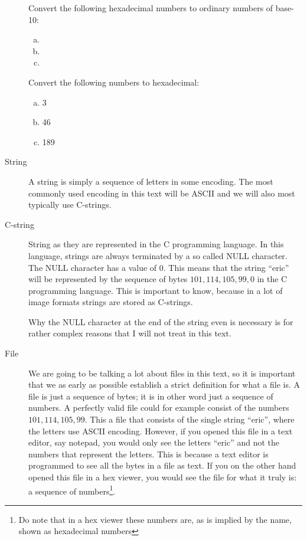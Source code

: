 \begin{description}
  \begin{Exercise}[label={hex-to-n}]
    Convert the following hexadecimal numbers to ordinary numbers of
    base-10:

    \begin{enumerate}[(a)]
    \item {}
    \item {}
    \item {}
    \end{enumerate}

  \end{Exercise}

  \begin{Exercise}[label={n-to-hex}]
    Convert the following numbers to hexadecimal:

    \begin{enumerate}[(a)]
    \item 3
    \item 46
    \item 189
    \end{enumerate}

  \end{Exercise}

\item[String] A string is simply a sequence of letters in some
  encoding. The most commonly used encoding in this text will be
  ASCII \cite{rfc20} and we will also most typically use C-strings.

\item[C-string] String as they are represented in the C programming
  language. In this language, strings are always terminated by a so
  called NULL character. The NULL character has a value of
  $0$\cite{kernighan1988c}. This means that the string ``eric'' will
  be represented by the sequence of bytes $101,114,105,99, 0$ in the C
  programming language. This is important to know, because in a lot of
  image formats strings are stored as C-strings.

  Why the NULL character at the end of the string even is necessary is
  for rather complex reasons that I will not treat in this text.

\item[File] We are going to be talking a lot about files in this text,
  so it is important that we as early as possible establish a strict
  definition for what a file is. A file is just a sequence of bytes;
  it is in other word just a sequence of numbers. A perfectly valid
  file could for example consist of the numbers $101,114,105,99$. This
  a file that consists of the single string ``eric'', where the
  letters use ASCII encoding. However, if you opened this file in a
  text editor, say notepad, you would only see the letters ``eric''
  and not the numbers that represent the letters. This is because a
  text editor is programmed to see all the bytes in a file as text. If
  you on the other hand opened this file in a hex viewer, you would
  see the file for what it truly is: a sequence of numbers\footnote{Do
    note that in a hex viewer these numbers are, as is implied by the
    name, shown as hexadecimal numbers}.



\end{description}
